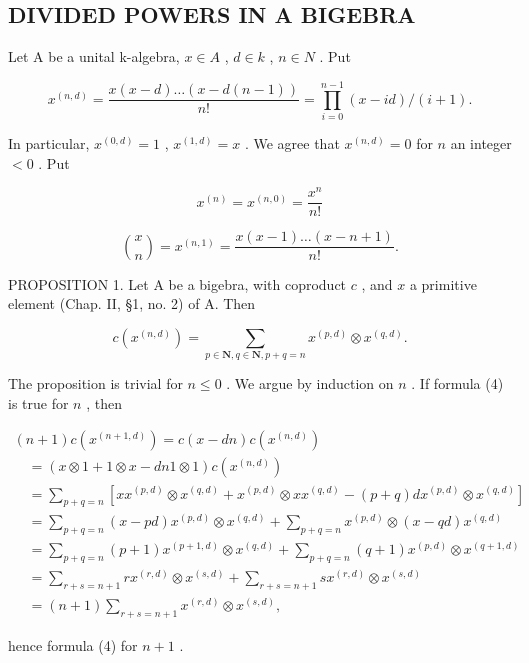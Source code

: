 \subsection{DIVIDED POWERS IN A BIGEBRA}

Let A be a unital k-algebra, \(x \in A\) , \(d \in k\) , \(n \in N\) . Put

\[
x ^ {(n, d)} = \frac {x (x - d) \dots (x - d (n - 1))}{n !} = \prod_ {i = 0} ^ {n - 1} (x - i d) / (i + 1).\tag{1}
\]

In particular, \(x^{(0,d)} = 1\) , \(x^{(1,d)} = x\) . We agree that \(x^{(n,d)} = 0\) for \(n\) an integer \(< 0\) . Put

\[
x ^ {(n)} = x ^ {(n, 0)} = \frac {x ^ {n}}{n !}\tag{2}
\]

\[
\binom {x} {n} = x ^ {(n, 1)} = \frac {x (x - 1) \ldots (x - n + 1)}{n !}.\tag{3}
\]

PROPOSITION 1. Let A be a bigebra, with coproduct \(c\) , and \(x\) a primitive element (Chap. II, §1, no. 2) of A. Then

\[
c (x ^ {(n, d)}) = \sum_ {p \in \mathbf {N}, q \in \mathbf {N}, p + q = n} x ^ {(p, d)} \otimes x ^ {(q, d)}.\tag{4}
\]

The proposition is trivial for \(n \leq 0\) . We argue by induction on \(n\) . If formula (4) is true for \(n\) , then

\[
\begin{array}{l} (n + 1) c (x ^ {(n + 1, d)}) = c (x - d n) c (x ^ {(n, d)}) \\ \quad = (x \otimes 1 + 1 \otimes x - d n   1 \otimes 1) c (x ^ {(n, d)}) \\ \quad = \sum_ {p + q = n} [ x x ^ {(p, d)} \otimes x ^ {(q, d)} + x ^ {(p, d)} \otimes x x ^ {(q, d)} - (p + q) d x ^ {(p, d)} \otimes x ^ {(q, d)} ] \\ \quad = \sum_ {p + q = n} (x - p d) x ^ {(p, d)} \otimes x ^ {(q, d)} + \sum_ {p + q = n} x ^ {(p, d)} \otimes (x - q d) x ^ {(q, d)} \\ \quad = \sum_ {p + q = n} (p + 1) x ^ {(p + 1, d)} \otimes x ^ {(q, d)} + \sum_ {p + q = n} (q + 1) x ^ {(p, d)} \otimes x ^ {(q + 1, d)} \\ \quad = \sum_ {r + s = n + 1} r x ^ {(r, d)} \otimes x ^ {(s, d)} + \sum_ {r + s = n + 1} s x ^ {(r, d)} \otimes x ^ {(s, d)} \\ \quad = (n + 1) \sum_ {r + s = n + 1} x ^ {(r, d)} \otimes x ^ {(s, d)}, \end{array}
\]

hence formula (4) for \(n + 1\) .

